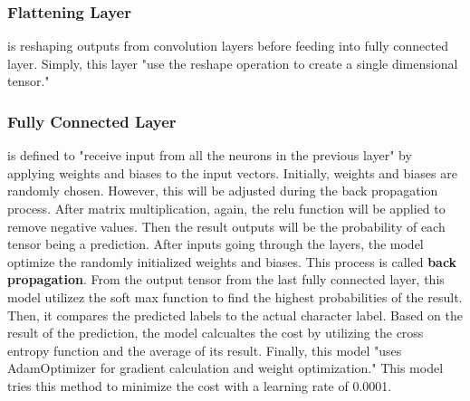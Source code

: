 \subsubsection{Flattening Layer}
is reshaping outputs from convolution layers before feeding into fully connected layer. Simply,
this layer "use the reshape operation to create a single dimensional tensor."\cite{sachan_2017}


\subsubsection{Fully Connected Layer}
is defined to "receive input from all the neurons in the previous layer"\cite{sachan_2017} by applying
weights and biases to the input vectors. Initially, weights and biases are randomly chosen. However, this
will be adjusted during the back propagation process. After matrix multiplication, again, the relu function
will be applied to remove negative values. Then the result outputs will be the probability of each tensor being
a prediction.
\newline
\newline
\indent
After inputs going through the layers, the model optimize the randomly initialized weights and biases. This process is called
\textbf{back propagation}.
From the output tensor from the last fully connected layer, this model utilizez the soft max function to find
the highest probabilities of the result. Then, it compares the predicted labels to the actual character label.
Based on the result of the prediction, the model calcualtes the cost by utilizing the cross entropy function and the
average of its result. Finally, this model "uses AdamOptimizer for gradient calculation and weight optimization."\cite{sachan_2017}
This model tries this method to minimize the cost with a learning rate of 0.0001.
